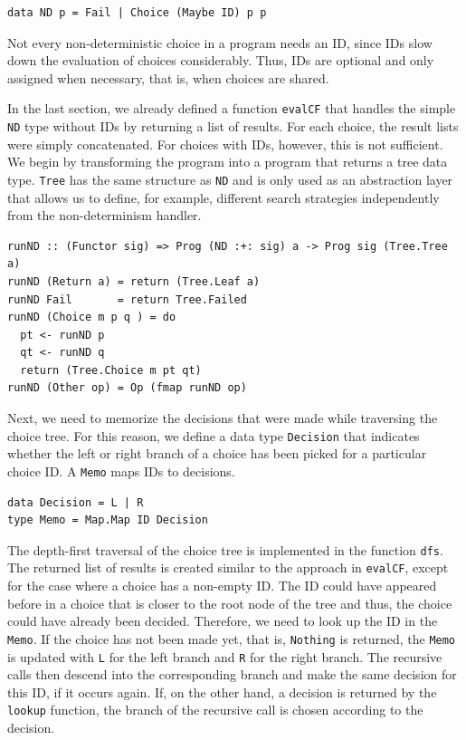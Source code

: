 \documentclass[a4paper, 11pt, fleqn, twoside, abstract=on]{scrreprt}
\newcommand{\hinl}[1]{\texttt{#1}}
\begin{document}
\begin{verbatim}
data ND p = Fail | Choice (Maybe ID) p p
\end{verbatim}

Not every non-deterministic choice in a program needs an ID, since IDs slow down the evaluation of choices considerably.
Thus, IDs are optional and only assigned when necessary, that is, when choices are shared.

In the last section, we already defined a function \hinl{evalCF} that handles the simple \hinl{ND} type without IDs by returning a list of results.
For each choice, the result lists were simply concatenated.
For choices with IDs, however, this is not sufficient.
We begin by transforming the program into a program that returns a tree data type.
\hinl{Tree} has the same structure as \hinl{ND} and is only used as an abstraction layer that allows us to define, for example, different search strategies independently from the non-determinism handler.
 
\begin{verbatim}
runND :: (Functor sig) => Prog (ND :+: sig) a -> Prog sig (Tree.Tree a)
runND (Return a) = return (Tree.Leaf a)
runND Fail       = return Tree.Failed
runND (Choice m p q ) = do
  pt <- runND p
  qt <- runND q
  return (Tree.Choice m pt qt)
runND (Other op) = Op (fmap runND op)
\end{verbatim}

Next, we need to memorize the decisions that were made while traversing the choice tree.
For this reason, we define a data type \hinl{Decision} that indicates whether the left or right branch of a choice has been picked for a particular choice ID.
A \hinl{Memo} maps IDs to decisions.

\begin{verbatim}
data Decision = L | R
type Memo = Map.Map ID Decision
\end{verbatim}

The depth-first traversal of the choice tree is implemented in the function \hinl{dfs}.
The returned list of results is created similar to the approach in \hinl{evalCF}, except for the case where a choice has a non-empty ID.
The ID could have appeared before in a choice that is closer to the root node of the tree and thus, the choice could have already been decided.
Therefore, we need to look up the ID in the \hinl{Memo}.
If the choice has not been made yet, that is, \hinl{Nothing} is returned, the \hinl{Memo} is updated with \hinl{L} for the left branch and \hinl{R} for the right branch.
The recursive calls then descend into the corresponding branch and make the same decision for this ID, if it occurs again.
If, on the other hand, a decision is returned by the \hinl{lookup} function, the branch of the recursive call is chosen according to the decision.
\end{document}
